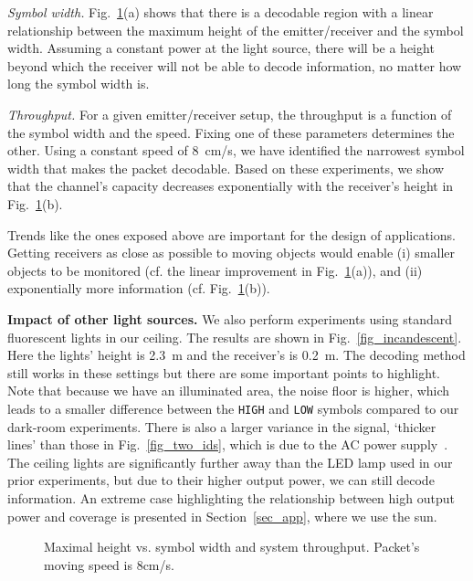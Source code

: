 \documentclass[10pt]{sig-alternate-05-2015}
\begin{document}
{\emph{Symbol width.} Fig.~\ref{fig_height_vs_width}(a) shows that there is a decodable region with a linear relationship between the maximum height of the emitter/receiver and the symbol width. Assuming a constant power at the light source, there will be a height beyond which the receiver will not be able to decode information, no matter how long the symbol width is. 

\emph{Throughput.} For a given emitter/receiver setup, the throughput is a function of the symbol width and the speed. Fixing one of these parameters determines the other. Using a constant speed of 8~cm/s, we have identified the narrowest symbol width that makes the packet decodable. Based on these experiments, we show that the channel's capacity decreases exponentially with the receiver's height in Fig.~\ref{fig_height_vs_width}(b). 

Trends like the ones exposed above are important for the design of applications. Getting receivers as close as possible to moving objects would enable 
(i) smaller objects to be monitored (cf. the linear improvement in Fig.~\ref{fig_height_vs_width}(a)), and (ii) exponentially more information (cf. Fig.~\ref{fig_height_vs_width}(b)).

{\bf Impact of other light sources.} We also perform experiments using standard fluorescent lights in our ceiling. The results are shown in Fig.~\ref{fig_incandescent}. Here the lights' height is 2.3~m and the receiver's is 0.2~m.
The decoding method still works in these settings but there are some important points to highlight.
Note that because we have an illuminated area, the noise floor is higher, which leads to a smaller difference between the \texttt{HIGH} and \texttt{LOW} symbols compared to our dark-room experiments. There is also a larger variance in the signal, `thicker lines' than those in Fig.~\ref{fig_two_ids}, which is due to the AC power supply~\cite{Kuo2014VLCS}. The ceiling lights are significantly further away than the LED lamp used in our prior experiments, but due to their higher output power, we can still decode information. An extreme case highlighting the relationship between high output power and coverage is presented in Section~\ref{sec_app}, where we use the sun.

\begin{figure}[!t]
	\hfill {}
	\vspace{-2mm}
	\caption {Maximal height vs. symbol width and system \newline throughput. Packet's moving speed is 8cm/s.}
	\vspace{-3mm}
	\label{fig_height_vs_width}
\end{figure}

}
\end{document}
